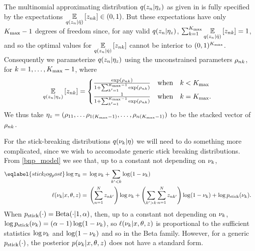 \begin{ex}
%
The multinomial approximating distribution $q(z_n \vert \eta_{z})$ as given in
 is fully specified by the expectations $\underset{q(z_n \vert
\hat\eta)}{\mathbb{E}}\left[z_{nk}\right] \in (0, 1)$.  But these expectations have only ${K_{\mathrm{max}}} -1$
degrees of freedom since, for any valid $q(z_n \vert \eta_{z})$,
$\sum_{k=1}^{K_{\mathrm{max}}} \underset{q(z_n \vert \hat\eta)}{\mathbb{E}}\left[z_{nk}\right] = 1$, and so the
optimal values for $\underset{q(z_n \vert \hat\eta)}{\mathbb{E}}\left[z_{nk}\right]$ cannot be
interior to $(0,1)^{K_{\mathrm{max}}}$.  Consequently we parameterize
$q(z_n \vert \eta_{z})$ using the unconstrained parameters $\rho_{nk}$,
for $k=1,\ldots,{K_{\mathrm{max}}} - 1$, where
%
\begin{align*}
%
\expect{\q(\z_\n \vert \etaz)}{\z_{\n\k}} =
\begin{cases}
    \frac{\exp(\rho_{\n\k})}{1 + \sum_{\k'=1}^{\kmax - 1}\exp(\rho_{\n\k})}
    & \mathrm{ when }\quad\k < \kmax \\
    \frac{1}{1 + \sum_{\k'=1}^{\kmax - 1}\exp(\rho_{\n\k})}
    & \mathrm{ when }\quad\k = \kmax.
\end{cases}
%
\end{align*}
%
We thus take $\eta_{z} = (\rho_{11}, \ldots \rho_{1({K_{\mathrm{max}}} - 1)}, \ldots,
\rho_{n({K_{\mathrm{max}}} - 1)})$ to be the stacked vector of $\rho_{nk}$.
%
\end{ex}



For the stick-breaking distributions $q(\nu_{k} \vert \eta)$ we will need to do
something more complicated, since we wish to accomodate generic stick breaking
distributions.  From \eqref{bnp_model} we see that, up to a constant not
depending on $\nu_{k}$,
%
\begin{align}\eqlabel{stick_log_post}
%
\log \pi_\k ={}&
    \log \nuk + \sum_{\k' < \k} \log (1 - \nuk) \nonumber \\
\logp(\nu_{\k} \vert \x, \theta, \z) ={}&
    \left(\sum_{\n=1}^\N \z_{\n\k'}\right) \log \nuk +
    \left( \sum_{\k' > \k} \sum_{\n=1}^\N \z_{\n\k'} \right) \log (1 - \nuk) +
    \log \pstick(\nuk).
%
\end{align}
%
When $p_{\mathrm{stick}}(\cdot) = \mathrm{Beta}(\cdot | 1, \alpha)$, then, up to a constant
not depending on $\nu_{k}$, $\log p_{\mathrm{stick}}(\nu_{k}) = (\alpha - 1) \log (1 -
\nu_{k})$, so $\ell(\nu_{k} \vert x, \theta, z)$ is proportional to the
sufficient statistics $\log \nu_{k}$ and $\log(1 - \nu_{k})$ and so in the
Beta family.  However, for a generic $p_{\mathrm{stick}}(\cdot)$, the posterior
$p(\nu_{k} \vert x, \theta, z)$ does not have a standard form.

